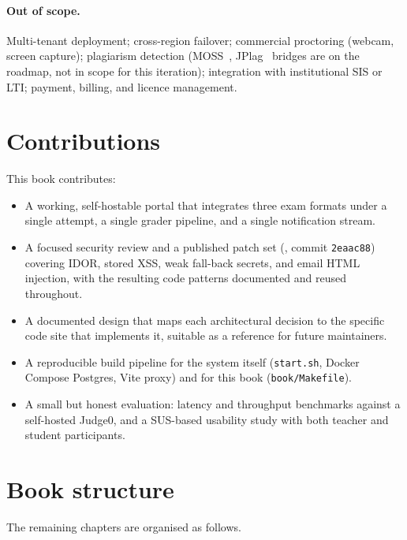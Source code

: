 \paragraph{Out of scope.} Multi-tenant deployment; cross-region failover; commercial proctoring (webcam, screen capture); plagiarism detection (MOSS~\cite{moss}, JPlag~\cite{prechelt2002jplag} bridges are on the roadmap, not in scope for this iteration); integration with institutional SIS or LTI; payment, billing, and licence management.

\section{Contributions}

This book contributes:

\begin{itemize}
  \item A working, self-hostable portal that integrates three exam formats under a single attempt, a single grader pipeline, and a single notification stream.
  \item A focused security review and a published patch set (, commit \texttt{2eaac88}) covering IDOR, stored XSS, weak fall-back secrets, and email HTML injection, with the resulting code patterns documented and reused throughout.
  \item A documented design that maps each architectural decision to the specific code site that implements it, suitable as a reference for future maintainers.
  \item A reproducible build pipeline for the system itself (\texttt{start.sh}, Docker Compose Postgres, Vite proxy) and for this book (\texttt{book/Makefile}).
  \item A small but honest evaluation: latency and throughput benchmarks against a self-hosted Judge0, and a SUS-based usability study with both teacher and student participants.
\end{itemize}

\section{Book structure}

The remaining chapters are organised as follows.


